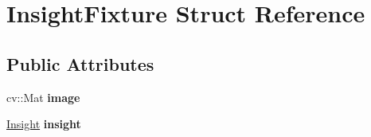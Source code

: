 \hypertarget{structInsightFixture}{}\section{Insight\+Fixture Struct Reference}
\label{structInsightFixture}
\subsection*{Public Attributes}
\begin{DoxyCompactItemize}
\item 
\hypertarget{structInsightFixture_a091b5851d860ecf4e4f9e106355cf0b8}{}cv\+::\+Mat {\bfseries image}\label{structInsightFixture_a091b5851d860ecf4e4f9e106355cf0b8}

\item 
\hypertarget{structInsightFixture_a24b98454e45eb2cbccd192c6deaf396e}{}\hyperlink{classinsight_1_1Insight}{Insight} {\bfseries insight}\label{structInsightFixture_a24b98454e45eb2cbccd192c6deaf396e}

\end{DoxyCompactItemize}
